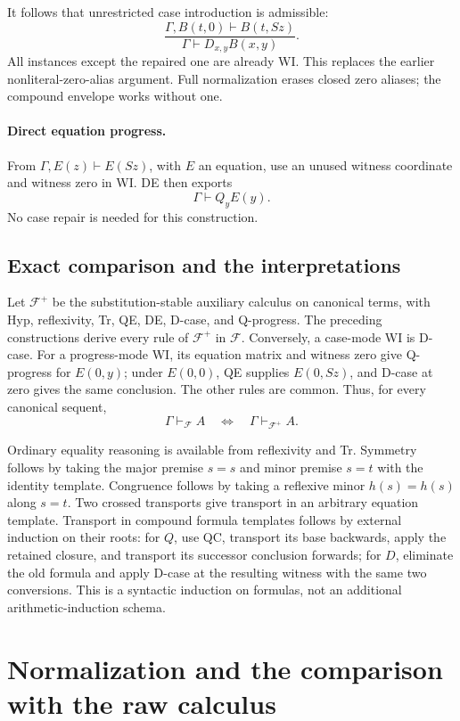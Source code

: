 \documentclass[11pt,letterpaper]{article}
\theoremstyle{definition}
\theoremstyle{remark}
\begin{document}
It follows that unrestricted case introduction is admissible:
\[
 \frac{\Gamma,B(t,0)\vdash B(t,Sz)}
      {\Gamma\vdash D_{x,y}B(x,y)}.
 \tag{D-case}\label{env:dcase}
\]
All instances except the repaired one are already WI. This replaces the
earlier nonliteral-zero-alias argument. Full normalization erases closed
zero aliases; the compound envelope works without one.

\paragraph{Direct equation progress.}
From $\Gamma,E(z)\vdash E(Sz)$, with $E$ an equation, use an unused
witness coordinate and witness zero in WI. DE then exports
\[
 \Gamma\vdash Q_yE(y).
 \tag{Q-progress}\label{env:qprog}
\]
No case repair is needed for this construction.

\subsection{Exact comparison and the interpretations}

Let $\mathcal F^+$ be the substitution-stable auxiliary calculus on canonical
terms, with Hyp, reflexivity, Tr, QE, DE, D-case, and Q-progress. The
preceding constructions derive every rule of $\mathcal F^+$ in
$\mathcal F$. Conversely, a case-mode WI is D-case. For a progress-mode
WI, its equation matrix and witness zero give Q-progress for $E(0,y)$;
under $E(0,0)$, QE supplies $E(0,Sz)$, and D-case at zero gives the same
conclusion. The other rules are common. Thus, for every canonical sequent,
\[
 \Gamma\vdash_{\mathcal F}A
 \quad\Longleftrightarrow\quad
 \Gamma\vdash_{\mathcal F^+}A.
 \tag{Exact consequence}\label{env:consequence}
\]

Ordinary equality reasoning is available from reflexivity and Tr.
Symmetry follows by taking the major premise $s=s$ and minor premise
$s=t$ with the identity template. Congruence follows by taking a
reflexive minor $h(s)=h(s)$ along $s=t$. Two crossed transports give
transport in an arbitrary equation template. Transport in compound
formula templates follows by external induction on their roots: for $Q$,
use QC, transport its base backwards, apply the retained closure, and
transport its successor conclusion forwards; for $D$, eliminate the old
formula and apply D-case at the resulting witness with the same two
conversions. This is a syntactic induction on formulas, not an additional
arithmetic-induction schema.


\section{Normalization and the comparison with the raw calculus}
\label{sec:fullnf-metatheory}
\end{document}
